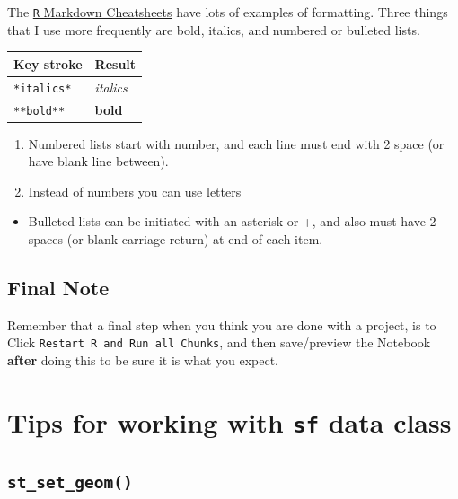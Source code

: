 \documentclass[
]{book}
\newcommand{\passthrough}[1]{#1}
\providecommand{\tightlist}{%
  \setlength{\itemsep}{0pt}\setlength{\parskip}{0pt}}
\begin{document}
The \href{https://rstudio.com/wp-content/uploads/2015/02/rmarkdown-cheatsheet.pdf}{\passthrough{\lstinline!R!} Markdown Cheatsheets} have lots of examples of formatting. Three things that I use more frequently are bold, italics, and numbered or bulleted lists.

\begin{longtable}[]{@{}ll@{}}
\toprule
Key stroke & Result\tabularnewline
\midrule
\endhead
\passthrough{\lstinline!*italics*!} & \emph{italics}\tabularnewline
\passthrough{\lstinline!**bold**!} & \textbf{bold}\tabularnewline
\bottomrule
\end{longtable}

\begin{enumerate}
\def\labelenumi{\arabic{enumi}.}
\tightlist
\item
  Numbered lists start with number, and each line must end with 2 space (or have blank line between).
\item
  Instead of numbers you can use letters
\end{enumerate}

\begin{itemize}
\tightlist
\item
  Bulleted lists can be initiated with an asterisk or +, and also must have 2 spaces (or blank carriage return) at end of each item.
\end{itemize}

\hypertarget{final-note}{%
\section*{Final Note}\label{final-note}}

Remember that a final step when you think you are done with a project, is to Click \passthrough{\lstinline!Restart R and Run all Chunks!}, and then save/preview the Notebook \textbf{after} doing this to be sure it is what you expect.

\hypertarget{sf-overview}{%
\chapter{\texorpdfstring{Tips for working with \texttt{sf} data class}{Tips for working with sf data class}}\label{sf-overview}}

\hypertarget{st_set_geom}{%
\section{\texorpdfstring{\texttt{st\_set\_geom()}}{st\_set\_geom()}}\label{st_set_geom}}
\end{document}
